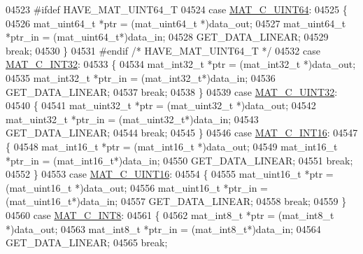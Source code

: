 \begin{DoxyCode}
{{{{{{{{{{{{{{{{{{{{{{{{{04523 \textcolor{preprocessor}{#ifdef HAVE\_MAT\_UINT64\_T}
04524         \textcolor{keywordflow}{case} \hyperlink{group___m_a_t_ggad4d60ae7b709fc81bfd744fb4c857c40a86470e25c3763d9a24623f04326195dd}{MAT\_C\_UINT64}:
04525         \{
04526             mat\_uint64\_t *ptr = (mat\_uint64\_t *)data\_out;
04527             mat\_uint64\_t *ptr\_in = (mat\_uint64\_t*)data\_in;
04528             GET\_DATA\_LINEAR;
04529             \textcolor{keywordflow}{break};
04530         \}
04531 \textcolor{preprocessor}{#endif }\textcolor{comment}{/* HAVE\_MAT\_UINT64\_T */}\textcolor{preprocessor}{}
04532         \textcolor{keywordflow}{case} \hyperlink{group___m_a_t_ggad4d60ae7b709fc81bfd744fb4c857c40adb44fc39694e3152ae5e69470a2fefe8}{MAT\_C\_INT32}:
04533         \{
04534             mat\_int32\_t *ptr = (mat\_int32\_t *)data\_out;
04535             mat\_int32\_t *ptr\_in = (mat\_int32\_t*)data\_in;
04536             GET\_DATA\_LINEAR;
04537             \textcolor{keywordflow}{break};
04538         \}
04539         \textcolor{keywordflow}{case} \hyperlink{group___m_a_t_ggad4d60ae7b709fc81bfd744fb4c857c40a9a17a7edd45b19ef68197db81b27e816}{MAT\_C\_UINT32}:
04540         \{
04541             mat\_uint32\_t *ptr = (mat\_uint32\_t *)data\_out;
04542             mat\_uint32\_t *ptr\_in = (mat\_uint32\_t*)data\_in;
04543             GET\_DATA\_LINEAR;
04544             \textcolor{keywordflow}{break};
04545         \}
04546         \textcolor{keywordflow}{case} \hyperlink{group___m_a_t_ggad4d60ae7b709fc81bfd744fb4c857c40a40370e9de516c5036a67a5865c071006}{MAT\_C\_INT16}:
04547         \{
04548             mat\_int16\_t *ptr = (mat\_int16\_t *)data\_out;
04549             mat\_int16\_t *ptr\_in = (mat\_int16\_t*)data\_in;
04550             GET\_DATA\_LINEAR;
04551             \textcolor{keywordflow}{break};
04552         \}
04553         \textcolor{keywordflow}{case} \hyperlink{group___m_a_t_ggad4d60ae7b709fc81bfd744fb4c857c40a8bede21dbf6c1edc0bbccc1481bccae7}{MAT\_C\_UINT16}:
04554         \{
04555             mat\_uint16\_t *ptr = (mat\_uint16\_t *)data\_out;
04556             mat\_uint16\_t *ptr\_in = (mat\_uint16\_t*)data\_in;
04557             GET\_DATA\_LINEAR;
04558             \textcolor{keywordflow}{break};
04559         \}
04560         \textcolor{keywordflow}{case} \hyperlink{group___m_a_t_ggad4d60ae7b709fc81bfd744fb4c857c40a984ff310f9e906100fcff95f704f43c5}{MAT\_C\_INT8}:
04561         \{
04562             mat\_int8\_t *ptr = (mat\_int8\_t *)data\_out;
04563             mat\_int8\_t *ptr\_in = (mat\_int8\_t*)data\_in;
04564             GET\_DATA\_LINEAR;
04565             \textcolor{keywordflow}{break};
}}}}}}}}}}}}}}}}}}}}}}}}}
\end{DoxyCode}

